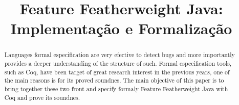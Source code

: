 \documentclass[bacharelado]{unb-cic}
\title{Feature Featherweight Java: Implementação e Formalização}
\begin{document}
  \maketitle
  \pretextual




  \begin{abstract}
  Languages formal especification are very efective to detect bugs and more importantly provides a deeper understanding of the structure of such. Formal especification tools, such as Coq, have been target of great research interest in the previous years, one of the main reasons is for its proved soundnes. The main objective of this paper is to bring together these two front and specify formaly Feature Featherweight Java with Coq and prove its soundnes.
  \end{abstract}

  \tableofcontents

  \textual
  
  

  \postextual
  
  
\end{document}
